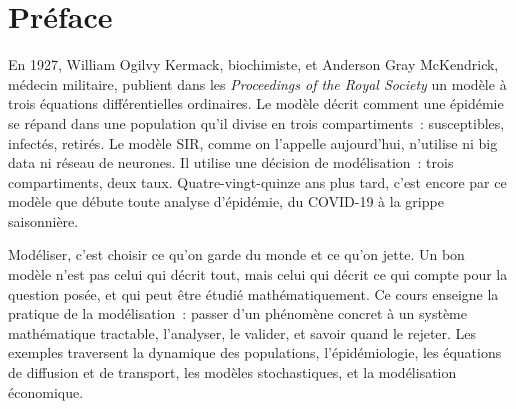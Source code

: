 \documentclass[12pt,a4paper,twoside]{book}
\theoremstyle{definition}
\theoremstyle{plain}
\theoremstyle{remark}
\begin{document}
\begin{titlepage}
\end{titlepage}

\frontmatter
\tableofcontents


\chapter*{Pr\'eface}

En 1927, William Ogilvy Kermack, biochimiste, et Anderson Gray McKendrick, m\'edecin militaire, publient dans les \emph{Proceedings of the Royal Society} un mod\`ele \`a trois \'equations diff\'erentielles ordinaires. Le mod\`ele d\'ecrit comment une \'epid\'emie se r\'epand dans une population qu'il divise en trois compartiments~: susceptibles, infect\'es, retir\'es. Le mod\`ele SIR, comme on l'appelle aujourd'hui, n'utilise ni big data ni r\'eseau de neurones. Il utilise une d\'ecision de mod\'elisation~: trois compartiments, deux taux. Quatre-vingt-quinze ans plus tard, c'est encore par ce mod\`ele que d\'ebute toute analyse d'\'epid\'emie, du COVID-19 \`a la grippe saisonni\`ere.

\medskip

Mod\'eliser, c'est choisir ce qu'on garde du monde et ce qu'on jette. Un bon mod\`ele n'est pas celui qui d\'ecrit tout, mais celui qui d\'ecrit ce qui compte pour la question pos\'ee, et qui peut \^etre \'etudi\'e math\'ematiquement. Ce cours enseigne la pratique de la mod\'elisation~: passer d'un ph\'enom\`ene concret \`a un syst\`eme math\'ematique tractable, l'analyser, le valider, et savoir quand le rejeter. Les exemples traversent la dynamique des populations, l'\'epid\'emiologie, les \'equations de diffusion et de transport, les mod\`eles stochastiques, et la mod\'elisation \'economique.
\end{document}
